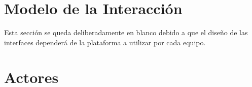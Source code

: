 \documentclass[oneside,10pt]{book}
\begin{document}

\chapter{Modelo de la Interacción}

{\color{UCInterfaceColor} 
	Esta sección se queda deliberadamente en blanco debido a que el diseño de las interfaces dependerá de la plataforma a utilizar por cada equipo.\\	
}



\chapter{Actores}

	
\end{document}
